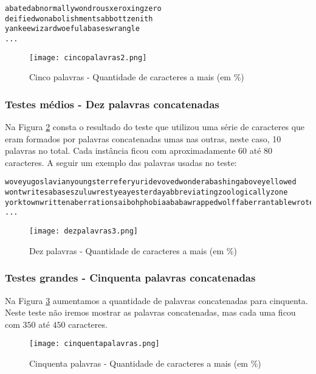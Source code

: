 \documentclass[12pt]{article}
\begin{document}
\begin{verbatim}
abatedabnormallywondrousxeroxingzero
deifiedwonabolishmentsabbottzenith
yankeewizardwoefulabaseswrangle
...
\end{verbatim}


    \begin{figure}[h!]
        \centering
        \texttt{[image: cincopalavras2.png]}
        \caption{Cinco palavras - Quantidade de caracteres a mais (em \%)}
        \label{cincopalavras}
    \end{figure}

\subsubsection{Testes médios - Dez palavras concatenadas}
\label{medio10}

Na Figura \ref{dezpalavras} consta o resultado do teste que utilizou uma série de caracteres que eram formados por palavras concatenadas umas nas outras, neste caso, 10 palavras no total. Cada instância ficou com aproximadamente $60$ até $80$ caracteres. A seguir um exemplo das palavras usadas no teste:

\begin{verbatim}
woveyugoslavianyoungsterreferyuridevovedwonderabashingaboveyellowed
wontwritesabaseszuluwrestyeayesterdayabbreviatingzoologicallyzone
yorktownwrittenaberrationsaibohphobiaababawrappedwolffaberrantablewrote
...
\end{verbatim}


    \begin{figure}[h!]
        \centering
        \texttt{[image: dezpalavras3.png]}
        \caption{Dez palavras - Quantidade de caracteres a mais (em \%)}
        \label{dezpalavras}
    \end{figure}


\subsubsection{Testes grandes - Cinquenta palavras concatenadas}
\label{grande50}

Na Figura \ref{cinquentapalavras} aumentamos a quantidade de palavras concatenadas para cinquenta. Neste teste não iremos mostrar as palavras concatenadas, mas cada uma ficou com $350$ até $450$ caracteres.

    \begin{figure}[h!]
        \centering
        \texttt{[image: cinquentapalavras.png]}
        \caption{Cinquenta palavras - Quantidade de caracteres a mais (em \%)}
        \label{cinquentapalavras}
    \end{figure}
\end{document}
